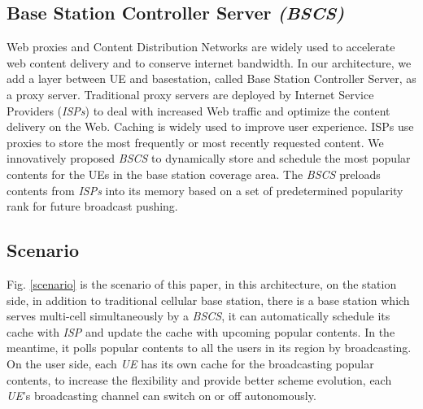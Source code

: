 \documentclass[conference]{IEEEtran}
\begin{document}
\subsection{Base Station Controller Server \emph{(BSCS)}}
Web proxies and Content Distribution Networks are widely used to accelerate web content delivery and to conserve internet bandwidth. In our architecture, we add a layer between UE and basestation, called Base Station Controller Server, as a proxy server.
Traditional proxy servers are deployed by Internet Service Providers (\emph{ISPs}) to deal with increased Web traffic and optimize the content delivery on the Web.
Caching is widely used to improve user experience. ISPs use proxies to store the most frequently or most recently requested content\cite{stamos2008caching}. We innovatively proposed \emph{BSCS} to dynamically store and schedule the most popular contents for the UEs in the base station coverage area. The \emph{BSCS} preloads contents from \emph{ISPs} into its memory based on a set of predetermined popularity rank for future broadcast pushing.


\subsection{Scenario}
Fig. \ref{scenario} is the scenario of this paper, in this architecture, on the station side, in addition to traditional cellular base station, there is a base station which serves multi-cell simultaneously by a \emph{BSCS}, it can automatically schedule its cache with \emph{ISP} and update the cache with upcoming popular contents. In the meantime, it polls popular contents to all the users in its region by broadcasting. On the user side, each \emph{UE} has its own cache for the broadcasting popular contents, to increase the flexibility and provide better scheme evolution, each \emph{UE}'s broadcasting channel can switch on or off autonomously.
  
\end{document}
